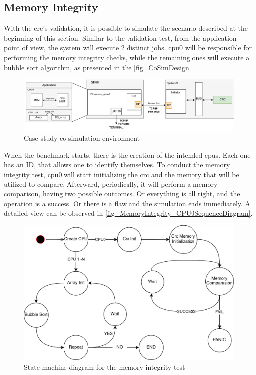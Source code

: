 \subsection{Memory Integrity}

With the \gls{crc}'s validation, it is possible to simulate the scenario described at the beginning of this section. 
Similar to the validation test, 
from the application point of view, the system will execute 2 distinct jobs. \gls{cpu}0 will be responsible for 
performing the memory integrity checks, while the remaining ones will execute a bubble sort algorithm, as presented in 
the \autoref{fig_CoSimDesign}.

\begin{figure}[H]
	\centering
 	\includegraphics[width=1\linewidth]{Images/CoSimDesign.png}
 	\caption{Case study co-simulation environment}
	 \label{fig_CoSimDesign}
\end{figure}

When the benchmark starts, there is the creation of the intended \glspl{cpu}. Each one has an ID, that allows one to identify
themselves. To conduct the memory integrity test, \gls{cpu}0 will start initializing the \gls{crc} and the memory that will 
be utilized to compare. Afterward, periodically, it will perform a memory comparison, having two possible outcomes. Or everything
is all right, and the operation is a success. Or there is a flaw and the simulation ends immediately. A detailed view can be 
observed in \ref{fig_MemoryIntegrity_CPU0SequenceDiagram}. 

\begin{figure}[H]
	\centering
 	\includegraphics[width=0.7\linewidth]{Images/MemoryIntegrity_StateDiagram.png}
 	\caption{State machine diagram for the memory integrity test}
	\label{fig_MemoryIntegrity_StateDiagram}
\end{figure}

